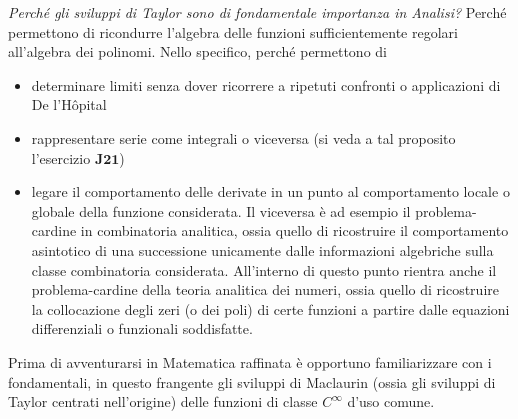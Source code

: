 \documentclass[a4paper,twoside]{article}
\theoremstyle{definition}
\numberwithin{theorem}{section}
\begin{document}
\emph{Perché gli sviluppi di Taylor sono di fondamentale importanza in Analisi?} Perché permettono di ricondurre l'algebra delle funzioni sufficientemente regolari all'algebra dei polinomi. Nello specifico, perché permettono di
\begin{itemize}
 \item determinare limiti senza dover ricorrere a ripetuti confronti o applicazioni di De l'H\^opital
 \item rappresentare serie come integrali o viceversa (si veda a tal proposito l'esercizio $\textbf{J21}$)
 \item legare il comportamento delle derivate in un punto al comportamento locale o globale della funzione considerata. Il viceversa è ad esempio il problema-cardine in combinatoria analitica, ossia quello di ricostruire il comportamento asintotico di una successione unicamente dalle informazioni algebriche sulla classe combinatoria considerata. All'interno di questo punto rientra anche il problema-cardine della teoria analitica dei numeri, ossia quello di ricostruire la collocazione degli zeri (o dei poli) di certe funzioni a partire dalle equazioni differenziali o funzionali soddisfatte.
\end{itemize}

Prima di avventurarsi in Matematica raffinata è opportuno familiarizzare con i fondamentali, in questo frangente gli sviluppi di Maclaurin (ossia gli sviluppi di Taylor centrati nell'origine) delle funzioni di classe $C^{\infty}$ d'uso comune.
\end{document}
